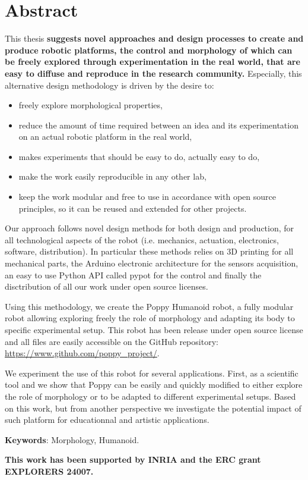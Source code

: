 %
\chapter*{Abstract}
\label{cha:abstract}
\vspace*{-10mm}

This thesis \textbf{suggests novel approaches and design processes to create and produce robotic platforms,  the control and morphology of which can be freely explored through experimentation in the real world,  that are easy to diffuse and reproduce in the research community.} Especially, this alternative design methodology is driven by the desire to:
\begin{itemize}
    \item freely explore morphological properties,
    \item reduce the amount of time required between an idea and its experimentation on an actual robotic platform in the real world,
    \item makes experiments that should be easy to do, actually easy to do,
    \item make the work easily reproducible in any other lab,
    \item keep the work modular and free to use in accordance with open source principles, so it can be reused and extended for other projects.
\end{itemize}

Our approach follows novel design methods for both design and production, for all technological aspects of the robot (i.e. mechanics, actuation, electronics, software, distribution). In particular these methods relies on 3D printing for all mechanical parts, the Arduino electronic architecture for the sensors acquisition, an easy to use Python API called pypot for the control and finally the disctribution of all our work under open source licenses.

Using this methodology, we create the Poppy Humanoid robot, a fully modular robot allowing exploring freely the role of morphology and adapting its body to specific experimental setup. This robot has been release under open source license and all files are easily accessible on the GitHub repository: \url{https://www.github.com/poppy_project/}.

We experiment the use of this robot for several applications. First, as a scientific tool and we show that Poppy can be easily and quickly modified to either explore the role of morphology or to be adapted to different experimental setups.
Based on this work, but from another perspective we investigate the potential impact of such platform for educationnal and artistic applications.

\textbf{Keywords}: Morphology, Humanoid.

\textbf{This work has been supported by INRIA and the ERC grant EXPLORERS 24007.}

